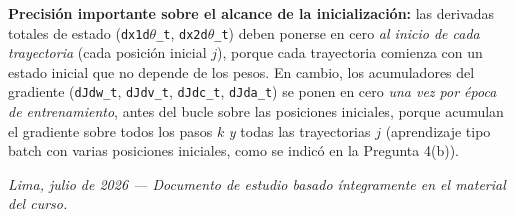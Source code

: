\documentclass[11pt,a4paper]{article}
\begin{document}
\textbf{Precisión importante sobre el alcance de la inicialización:} las derivadas totales de estado (\texttt{dx1d}$\theta$\texttt{\_t}, \texttt{dx2d}$\theta$\texttt{\_t}) deben ponerse en cero \emph{al inicio de cada trayectoria} (cada posición inicial $j$), porque cada trayectoria comienza con un estado inicial que no depende de los pesos. En cambio, los acumuladores del gradiente (\texttt{dJdw\_t}, \texttt{dJdv\_t}, \texttt{dJdc\_t}, \texttt{dJda\_t}) se ponen en cero \emph{una vez por época de entrenamiento}, antes del bucle sobre las posiciones iniciales, porque acumulan el gradiente sobre todos los pasos $k$ \emph{y} todas las trayectorias $j$ (aprendizaje tipo batch con varias posiciones iniciales, como se indicó en la Pregunta 4(b)).

\vspace{16pt}
\begin{center}
\small\itshape Lima, julio de 2026 --- Documento de estudio basado íntegramente en el material del curso.
\end{center}
\end{document}

